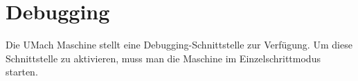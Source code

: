 \chapter{Debugging}

Die UMach Maschine stellt eine Debugging-Schnittstelle zur Verfügung. Um diese
Schnittstelle zu aktivieren, muss man die Maschine im Einzelschrittmodus
starten.

